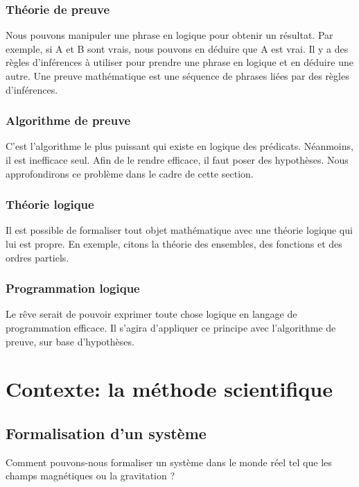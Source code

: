 \subsubsection{Théorie de preuve}

Nous pouvons manipuler une phrase en logique pour obtenir un résultat. Par exemple, si A et B sont vrais, nous pouvons en déduire que A est vrai. Il y a des règles d'inférences à utiliser pour prendre une phrase en logique et en déduire une autre.
Une preuve mathématique est une séquence de phrases liées par des règles d'inférences.

\subsubsection{Algorithme de preuve}
C'est l'algorithme le plus puissant qui existe en logique des prédicats. Néanmoins, il est inefficace seul. Afin de le rendre efficace, il faut poser des hypothèses. Nous approfondirons ce problème dans le cadre de cette section. 

\subsubsection{Théorie logique}

Il est possible de formaliser tout objet mathématique avec une théorie logique qui lui est propre.  En exemple, citons la théorie des ensembles, des fonctions et des ordres partiels.

\subsubsection{Programmation logique}

Le rêve serait de pouvoir exprimer toute chose logique en langage de programmation efficace. Il s'agira d'appliquer ce principe avec l'algorithme de preuve, sur base d'hypothèses.

\newpage
\section{Contexte: la méthode scientifique}

\subsection{Formalisation d'un système}

Comment pouvons-nous formaliser un système dans le monde réel tel que les champs magnétiques ou la gravitation ?

